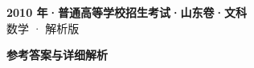 \documentclass[zihao=-4, a4paper]{ctexart}
\begin{document}
\begin{center}
  {\Large\bfseries 2010 年·普通高等学校招生考试·山东卷·文科}\\[4pt]
  {\large 数学 · 解析版}
\end{center}
\medskip
{}

\clearpage
{}
\begin{center}{\Large\bfseries 参考答案与详细解析}\end{center}
\medskip

\end{document}
